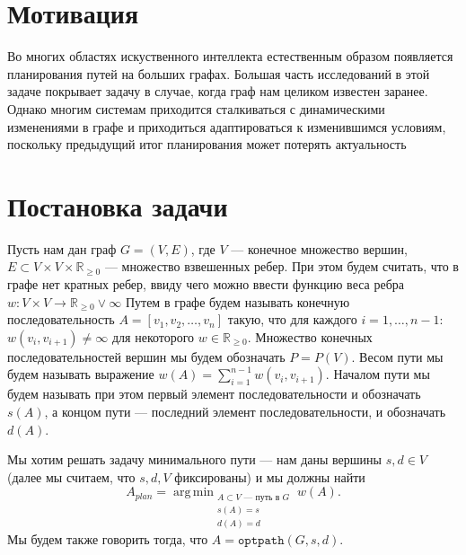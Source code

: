 \documentclass[11pt]{article}
\newcommand{\realpositive}{\mathbb{R}_{\geqslant 0}}
\DeclareMathOperator*{\argmin}{arg\,min}
\begin{document}
     \section{Мотивация}
     Во многих областях искуственного интеллекта естественным образом появляется планирования путей на больших графах.
     Большая часть исследований в этой задаче покрывает задачу в случае, когда граф нам целиком известен заранее.
     Однако многим системам приходится сталкиваться с динамическими изменениями в графе и приходиться адаптироваться к изменившимся условиям, поскольку предыдущий итог планирования может потерять актуальность

     \section{Постановка задачи}
     Пусть нам дан граф $G = (V, E)$, где $V$ --- конечное множество вершин, $E \subset V \times V \times \realpositive$ --- множество взвешенных ребер.
     При этом будем считать, что в графе нет кратных ребер, ввиду чего можно ввести функцию веса ребра $w: V \times V \rightarrow {\realpositive \lor \infty}$
     Путем в графе будем называть конечную последовательность $A = [v_1, v_2, \dots, v_n]$ такую, что для каждого $i = 1, \dots, n-1$: $w(v_i, v_{i+1}) \neq \infty$ для некоторого $w \in \mathbb{R}_{\geqslant 0}$.
     Множество конечных последовательностей вершин мы будем обозначать $P = P(V)$.
     Весом пути мы будем называть выражение $w(A) = \sum_{i = 1}^{n-1} w(v_i, v_{i+1})$.
     Началом пути мы будем называть при этом первый элемент последовательности и обозначать $s(A)$, а концом пути --- последний элемент последовательности, и обозначать $d(A)$.

     Мы хотим решать задачу минимального пути --- нам даны вершины $s, d \in V$  (далее мы считаем, что $s, d, V$ фиксированы) и мы должны найти
     $$A_{plan}= \argmin_{\substack{A \subset V \text{ --- путь в } G \\ s(A) = s \\ d(A) = d}} w(A).$$
     Мы будем также говорить тогда, что $A = \mathtt{optpath}(G, s, d)$.
\end{document}
